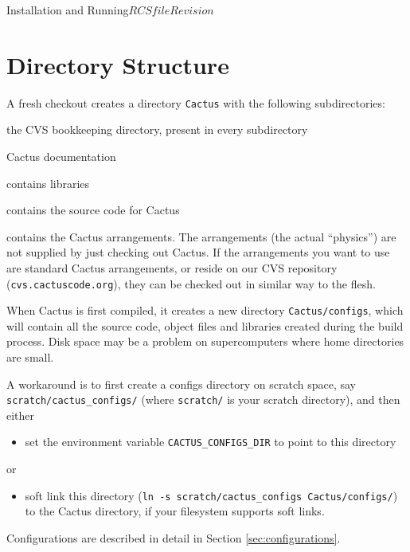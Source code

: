 \begin{cactuspart}{Installation and Running}{$RCSfile$}{$Revision$}
\section{Directory Structure}
\label{sec:dist}

A fresh checkout creates a directory \texttt{Cactus} with the
following subdirectories:

\begin{Lentry}

\item[\texttt{CVS}] the CVS bookkeeping directory, present in every subdirectory

\item[\texttt{doc}] Cactus documentation

\item[\texttt{lib}] contains libraries

\item[\texttt{src}] contains the source code for Cactus

\item [\texttt{arrangements}] contains the Cactus arrangements. The arrangements
  (the actual ``physics'') are not supplied by just checking out Cactus.
  If the arrangements you want to use are standard Cactus arrangements, or
  reside on our CVS repository (\texttt{cvs.cactuscode.org}),
  they can be checked out in similar way to the flesh.
\end{Lentry}

When Cactus is first compiled, it creates a new directory
\texttt{Cactus/configs}, which will contain all the source code, object files
and libraries created during the build process.  Disk space may be a problem
on supercomputers where home directories are small.

A workaround is to first create a
configs directory on scratch space, say \texttt{scratch/cactus\_configs/} (where
\texttt{scratch/} is your scratch directory), and then either
\begin{itemize}
\item{} set the environment variable \texttt{CACTUS\_CONFIGS\_DIR} to point to
this directory
\end{itemize}
or
\begin{itemize}
\item{}  soft link this directory (\texttt{ln -s
scratch/cactus\_configs Cactus/configs/}) to the Cactus directory, if your
filesystem supports soft links.
\end{itemize}

Configurations are described in detail in Section \ref{sec:configurations}.


\end{cactuspart}
